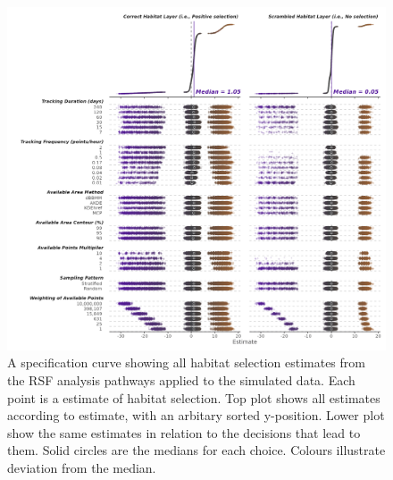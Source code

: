 \documentclass[10pt,a4paper]{article}
\begin{document}
\begin{figure}
\includegraphics[width=1\linewidth]{../figures/rsfSpecCurve} \caption{A specification curve showing all habitat selection estimates from the RSF analysis pathways applied to the simulated data. Each point is a estimate of habitat selection. Top plot shows all estimates according to estimate, with an arbitary sorted y-position. Lower plot show the same estimates in relation to the decisions that lead to them. Solid circles are the medians for each choice. Colours illustrate deviation from the median.}\label{fig:specCurveRSF}
\end{figure}
\end{document}

